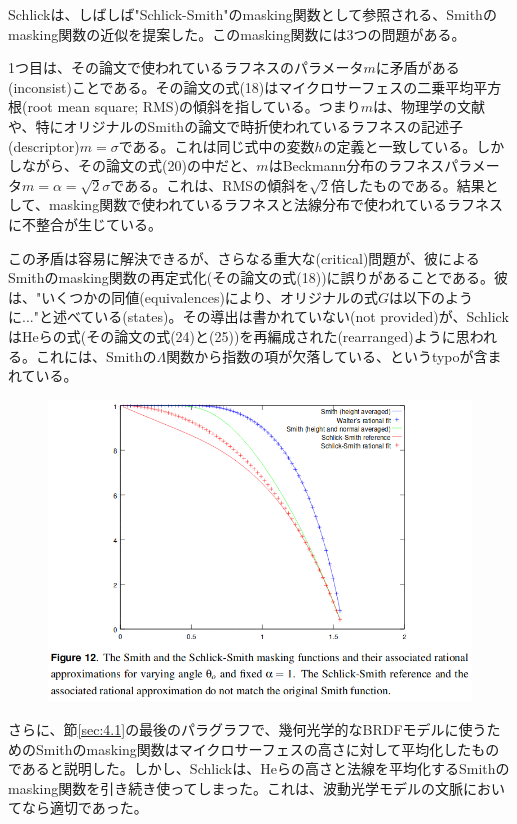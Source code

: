 \documentclass[a4j,xelatex,ja=standard]{bxjsarticle}
\begin{document}
Schlickは、しばしば"Schlick-Smith"のmasking関数として参照される、Smithのmasking関数の近似を提案した。このmasking関数には3つの問題がある。

1つ目は、その論文で使われているラフネスのパラメータ$m$に矛盾がある(inconsist)ことである。その論文の式(18)はマイクロサーフェスの二乗平均平方根(root mean square; RMS)の傾斜を指している。つまり$m$は、物理学の文献や、特にオリジナルのSmithの論文で時折使われているラフネスの記述子(descriptor)$m = \sigma$である。これは同じ式中の変数$h$の定義と一致している。しかしながら、その論文の式(20)の中だと、$m$はBeckmann分布のラフネスパラメータ$m = \alpha = \sqrt{2} \sigma$である。これは、RMSの傾斜を$\sqrt{2}$倍したものである。結果として、masking関数で使われているラフネスと法線分布で使われているラフネスに不整合が生じている。

この矛盾は容易に解決できるが、さらなる重大な(critical)問題が、彼によるSmithのmasking関数の再定式化(その論文の式(18))に誤りがあることである。彼は、"いくつかの同値(equivalences)により、オリジナルの式$G$は以下のように..."と述べている(states)。その導出は書かれていない(not provided)が、SchlickはHeらの式(その論文の式(24)と(25))を再編成された(rearranged)ように思われる。これには、Smithの$\Lambda$関数から指数の項が欠落している、というtypoが含まれている。

\begin{figure}
    \includegraphics[width=\textwidth]{Figure12.png}
    \caption{}
    \label{fig:12}
\end{figure}

さらに、節\ref{sec:4.1}の最後のパラグラフで、幾何光学的なBRDFモデルに使うためのSmithのmasking関数はマイクロサーフェスの高さに対して平均化したものであると説明した。しかし、Schlickは、Heらの高さと法線を平均化するSmithのmasking関数を引き続き使ってしまった。これは、波動光学モデルの文脈においてなら適切であった。
\end{document}

